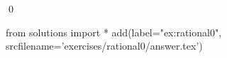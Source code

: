 
\begin{ex} 
  \label{ex:rational0}
  
  \qed
\end{ex} 
\begin{python0}
from solutions import *
add(label="ex:rational0",
    srcfilename='exercises/rational0/answer.tex') 
\end{python0}
